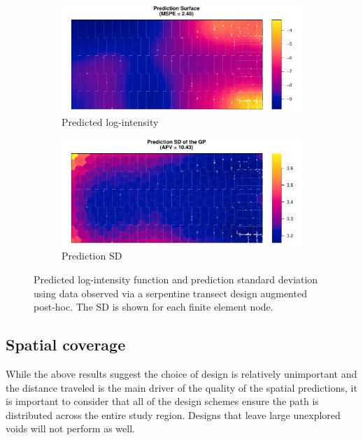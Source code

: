 \documentclass[review]{elsarticle}
\begin{document}
\begin{figure}

\begin{subfigure}{5in}
\includegraphics[width=5in]{../graphics/lambda-Aug-LGCP000004.pdf}
\caption{Predicted log-intensity}
\label{lambdaaug}
\end{subfigure}

\begin{subfigure}{5in}
\includegraphics[width=5in]{../graphics/lambdaSD-Aug-LGCP000004.pdf}
\caption{Prediction SD}
\label{sdaug}
\end{subfigure}

\caption{Predicted log-intensity function and prediction standard deviation
using data observed via a serpentine transect design augmented post-hoc. The
SD is shown for each finite element node.}
\label{aug}
\end{figure}


\subsection{Spatial coverage}

While the above results suggest the choice of design is relatively unimportant
and the distance traveled is the main driver of the quality of the spatial
predictions, it is important to consider that all of the design schemes ensure
the path is distributed across the entire study region. Designs that leave
large unexplored voids will not perform as well.
\end{document}
